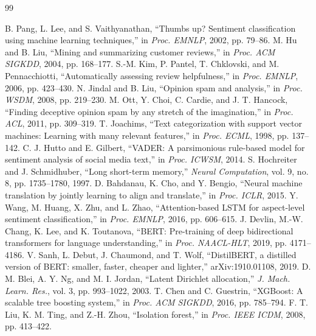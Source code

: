 \documentclass[12pt,a4paper]{report}
\begin{document}
\begin{thebibliography}{99}
 B. Pang, L. Lee, and S. Vaithyanathan, ``Thumbs up? Sentiment classification using machine learning techniques,'' in \emph{Proc. EMNLP}, 2002, pp. 79--86.
 M. Hu and B. Liu, ``Mining and summarizing customer reviews,'' in \emph{Proc. ACM SIGKDD}, 2004, pp. 168--177.
 S.-M. Kim, P. Pantel, T. Chklovski, and M. Pennacchiotti, ``Automatically assessing review helpfulness,'' in \emph{Proc. EMNLP}, 2006, pp. 423--430.
 N. Jindal and B. Liu, ``Opinion spam and analysis,'' in \emph{Proc. WSDM}, 2008, pp. 219--230.
 M. Ott, Y. Choi, C. Cardie, and J. T. Hancock, ``Finding deceptive opinion spam by any stretch of the imagination,'' in \emph{Proc. ACL}, 2011, pp. 309--319.
 T. Joachims, ``Text categorization with support vector machines: Learning with many relevant features,'' in \emph{Proc. ECML}, 1998, pp. 137--142.
 C. J. Hutto and E. Gilbert, ``VADER: A parsimonious rule-based model for sentiment analysis of social media text,'' in \emph{Proc. ICWSM}, 2014.
 S. Hochreiter and J. Schmidhuber, ``Long short-term memory,'' \emph{Neural Computation}, vol. 9, no. 8, pp. 1735--1780, 1997.
 D. Bahdanau, K. Cho, and Y. Bengio, ``Neural machine translation by jointly learning to align and translate,'' in \emph{Proc. ICLR}, 2015.
 Y. Wang, M. Huang, X. Zhu, and L. Zhao, ``Attention-based LSTM for aspect-level sentiment classification,'' in \emph{Proc. EMNLP}, 2016, pp. 606--615.
 J. Devlin, M.-W. Chang, K. Lee, and K. Toutanova, ``BERT: Pre-training of deep bidirectional transformers for language understanding,'' in \emph{Proc. NAACL-HLT}, 2019, pp. 4171--4186.
 V. Sanh, L. Debut, J. Chaumond, and T. Wolf, ``DistilBERT, a distilled version of BERT: smaller, faster, cheaper and lighter,'' arXiv:1910.01108, 2019.
 D. M. Blei, A. Y. Ng, and M. I. Jordan, ``Latent Dirichlet allocation,'' \emph{J. Mach. Learn. Res.}, vol. 3, pp. 993--1022, 2003.
 T. Chen and C. Guestrin, ``XGBoost: A scalable tree boosting system,'' in \emph{Proc. ACM SIGKDD}, 2016, pp. 785--794.
 F. T. Liu, K. M. Ting, and Z.-H. Zhou, ``Isolation forest,'' in \emph{Proc. IEEE ICDM}, 2008, pp. 413--422.

\end{thebibliography}
\end{document}

